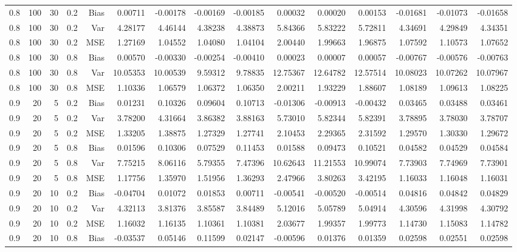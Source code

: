 \begin{table}[!htbp]
\begin{tabular}{lrrrrrrrrrrrrrr}
0.8 & 100 & 30 & 0.2 & Bias & 0.00711 & -0.00178 & -0.00169 & -0.00185 & 0.00032 & 0.00020 & 0.00153 & -0.01681 & -0.01073 & -0.01658 \\
0.8 & 100 & 30 & 0.2 & Var & 4.28177 & 4.46144 & 4.38238 & 4.38873 & 5.84366 & 5.83222 & 5.72811 & 4.34691 & 4.29849 & 4.34351 \\
0.8 & 100 & 30 & 0.2 & MSE & 1.27169 & 1.04552 & 1.04080 & 1.04104 & 2.00440 & 1.99663 & 1.96875 & 1.07592 & 1.10573 & 1.07652 \\
0.8 & 100 & 30 & 0.8 & Bias & 0.00570 & -0.00330 & -0.00254 & -0.00410 & 0.00023 & 0.00007 & 0.00057 & -0.00767 & -0.00576 & -0.00763 \\
0.8 & 100 & 30 & 0.8 & Var & 10.05353 & 10.00539 & 9.59312 & 9.78835 & 12.75367 & 12.64782 & 12.57514 & 10.08023 & 10.07262 & 10.07967 \\
0.8 & 100 & 30 & 0.8 & MSE & 1.10336 & 1.06579 & 1.06372 & 1.06350 & 2.00211 & 1.93229 & 1.88607 & 1.08189 & 1.09613 & 1.08225 \\
0.9 &  20 &  5 & 0.2 & Bias & 0.01231 & 0.10326 & 0.09604 & 0.10713 & -0.01306 & -0.00913 & -0.00432 & 0.03465 & 0.03488 & 0.03461 \\
0.9 &  20 &  5 & 0.2 & Var & 3.78200 & 4.31664 & 3.86382 & 3.88163 & 5.73010 & 5.82344 & 5.82391 & 3.78895 & 3.78030 & 3.78707 \\
0.9 &  20 &  5 & 0.2 & MSE & 1.33205 & 1.38875 & 1.27329 & 1.27741 & 2.10453 & 2.29365 & 2.31592 & 1.29570 & 1.30330 & 1.29672 \\
0.9 &  20 &  5 & 0.8 & Bias & 0.01596 & 0.10306 & 0.07529 & 0.11453 & 0.01588 & 0.09473 & 0.10521 & 0.04582 & 0.04529 & 0.04584 \\
0.9 &  20 &  5 & 0.8 & Var & 7.75215 & 8.06116 & 5.79355 & 7.47396 & 10.62643 & 11.21553 & 10.99074 & 7.73903 & 7.74969 & 7.73901 \\
0.9 &  20 &  5 & 0.8 & MSE & 1.17756 & 1.35970 & 1.51956 & 1.36293 & 2.47966 & 3.80263 & 3.42195 & 1.16033 & 1.16048 & 1.16031 \\
0.9 &  20 & 10 & 0.2 & Bias & -0.04704 & 0.01072 & 0.01853 & 0.00711 & -0.00541 & -0.00520 & -0.00514 & 0.04816 & 0.04842 & 0.04829 \\
0.9 &  20 & 10 & 0.2 & Var & 4.32113 & 3.81376 & 3.85587 & 3.84489 & 5.12016 & 5.05789 & 5.04914 & 4.30596 & 4.31998 & 4.30792 \\
0.9 &  20 & 10 & 0.2 & MSE & 1.16032 & 1.16135 & 1.10361 & 1.10381 & 2.03677 & 1.99357 & 1.99773 & 1.14730 & 1.15083 & 1.14782 \\
0.9 &  20 & 10 & 0.8 & Bias & -0.03537 & 0.05146 & 0.11599 & 0.02147 & -0.00596 & 0.01376 & 0.01359 & 0.02598 & 0.02551 & 0.02598 \\

\end{tabular}
\end{table}

